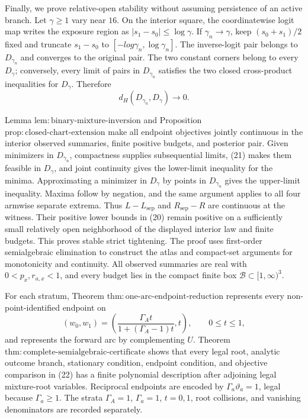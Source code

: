 Finally, we prove relative-open stability without assuming persistence of an active branch.  Let \(\gamma\geq1\) vary near \(16\).  On the interior square, the coordinatewise logit map writes the exposure region as \(|s_1-s_0|\leq\log\gamma\).  If \(\gamma_n\to\gamma\), keep \((s_0+s_1)/2\) fixed and truncate \(s_1-s_0\) to \([-log\gamma_n,\log\gamma_n]\).  The inverse-logit pair belongs to \(D_{\gamma_n}\) and converges to the original pair.  The two constant corners belong to every \(D_\gamma\); conversely, every limit of pairs in \(D_{\gamma_n}\) satisfies the two closed cross-product inequalities for \(D_\gamma\).  Therefore
\[
 d_H(D_{\gamma_n},D_\gamma)\longrightarrow0.                           \tag{21}
\]

Lemma \(\mathrm{lem{:}binary\text{-}mixture\text{-}inversion}\) and Proposition \(\mathrm{prop{:}closed\text{-}chart\text{-}extension}\) make all endpoint objectives jointly continuous in the interior observed summaries, finite positive budgets, and posterior pair.  Given minimizers in \(D_{\gamma_n}\), compactness supplies subsequential limits, (21) makes them feasible in \(D_\gamma\), and joint continuity gives the lower-limit inequality for the minima.  Approximating a minimizer in \(D_\gamma\) by points in \(D_{\gamma_n}\) gives the upper-limit inequality.  Maxima follow by negation, and the same argument applies to all four armwise separate extrema.  Thus \(L-L_{\mathrm{sep}}\) and \(R_{\mathrm{sep}}-R\) are continuous at the witness.  Their positive lower bounds in (20) remain positive on a sufficiently small relatively open neighborhood of the displayed interior law and finite budgets.  This proves stable strict tightening.
The proof uses first-order semialgebraic elimination to construct the atlas and compact-set arguments for monotonicity and continuity.  All observed summaries are real with \(0<p_x,r_{a,x}<1\), and every budget lies in the compact finite box \(\mathcal B\subset[1,\infty)^3\).

For each stratum, Theorem \(\mathrm{thm{:}one\text{-}arc\text{-}endpoint\text{-}reduction}\) represents every non-point-identified endpoint on
\[
 (w_0,w_1)=\left(\frac{\Gamma_A t}{1+(\Gamma_A-1)t},t\right),
 \qquad 0\leq t\leq1,                                                   \tag{22}
\]
and represents the forward arc by complementing \(U\).  Theorem \(\mathrm{thm{:}complete\text{-}semialgebraic\text{-}certificate}\) shows that every legal root, analytic outcome branch, stationary condition, endpoint condition, and objective comparison in (22) has a finite polynomial description after adjoining legal mixture-root variables.  Reciprocal endpoints are encoded by \(\Gamma_a\vartheta_a=1\), legal because \(\Gamma_a\geq1\).  The strata \(\Gamma_A=1\), \(\Gamma_a=1\), \(t=0,1\), root collisions, and vanishing denominators are recorded separately.

